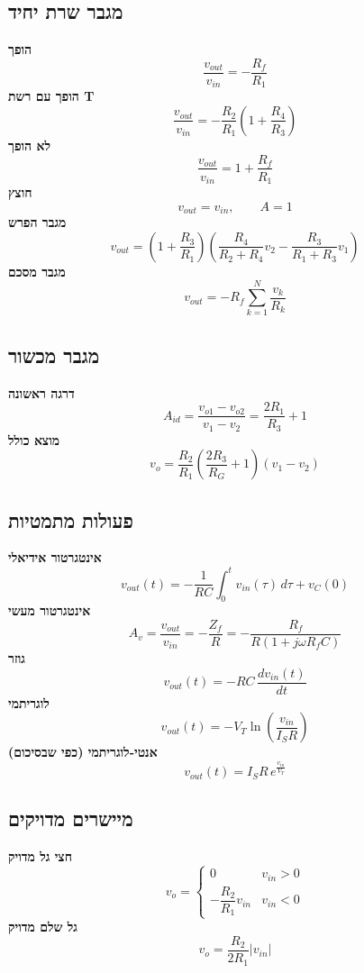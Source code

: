 \documentclass[11pt]{article}
\begin{document}
\subsection*{מגבר שרת יחיד}
\textbf{הופך}
\[\frac{v_{out}}{v_{in}}=-\frac{R_f}{R_1}\]
\textbf{הופך עם רשת T}
\[\frac{v_{out}}{v_{in}}=-\frac{R_2}{R_1}\left(1+\frac{R_4}{R_3}\right)\]
\textbf{לא הופך}
\[\frac{v_{out}}{v_{in}}=1+\frac{R_f}{R_1}\]
\textbf{חוצץ}
\[v_{out}=v_{in},\qquad A=1\]
\textbf{מגבר הפרש}
\[v_{out}=\left(1+\frac{R_3}{R_1}\right)\left(\frac{R_4}{R_2+R_4}v_2-\frac{R_3}{R_1+R_3}v_1\right)\]
\textbf{מגבר מסכם}
\[v_{out}=-R_f\sum_{k=1}^{N}\frac{v_k}{R_k}\]
\subsection*{מגבר מכשור}
\textbf{דרגה ראשונה}
\[A_{id}=\frac{v_{o1}-v_{o2}}{v_1-v_2}=\frac{2R_1}{R_3}+1\]
\textbf{מוצא כולל}
\[v_o=\frac{R_2}{R_1}\left(\frac{2R_3}{R_G}+1\right)\left(v_1-v_2\right)\]
\subsection*{פעולות מתמטיות}
\textbf{אינטגרטור אידיאלי}
\[v_{out}(t)=-\frac{1}{RC}\int_0^t v_{in}(\tau)\,d\tau+v_C(0)\]
\textbf{אינטגרטור מעשי}
\[A_v=\frac{v_{out}}{v_{in}}=-\frac{Z_f}{R}=-\frac{R_f}{R\left(1+j\omega R_fC\right)}\]
\textbf{גוזר}
\[v_{out}(t)=-RC\,\frac{dv_{in}(t)}{dt}\]
\textbf{לוגריתמי}
\[v_{out}(t)=-V_T\ln\left(\frac{v_{in}}{I_SR}\right)\]
\textbf{אנטי-לוגריתמי (כפי שבסיכום)}
\[v_{out}(t)=I_SR\,e^{\frac{v_{in}}{V_T}}\]
\subsection*{מיישרים מדויקים}
\textbf{חצי גל מדויק}
\[v_o=\begin{cases}0 & v_{in}>0\\ -\dfrac{R_2}{R_1}v_{in} & v_{in}<0\end{cases}\]
\textbf{גל שלם מדויק}
\[v_o=\frac{R_2}{2R_1}\left|v_{in}\right|\]
\end{document}
